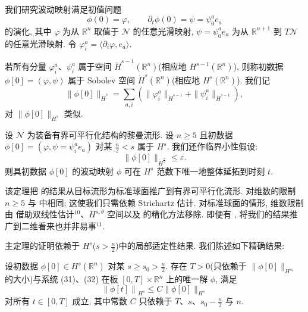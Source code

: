 我们研究波动映射满足初值问题
\[
\phi(0)=\varphi,\qquad\partial_{t}\phi(0)=\psi=\psi_{0}^{a}e_{a}
\]
的演化, 其中 $\varphi$ 为从 $\mathbb{R}^n$ 取值于 $\mathcal{N}$ 的任意光滑映射, $\psi = \psi_0^a e_a$ 为从 $\mathbb{R}^{n+1}$ 到 $T\mathcal{N}$ 的任意光滑映射. 令 $\varphi_i^a = \langle \partial_i \varphi, e_a \rangle$.
\begin{definition}\label{def:2.15}
若所有分量 $\varphi_i^a$、$\psi_i^a$ 属于空间 $\dot{H}^{s-1}(\mathbb{R}^n)$(相应地 $H^{s-1}(\mathbb{R}^n)$), 则称初数据 $\phi[0] = (\varphi, \psi)$ 属于 Sobolev 空间 $\dot{H}^s(\mathbb{R}^n)$(相应地 $H^s(\mathbb{R}^n)$). 我们记
\[
\|\phi[0]\|_{\dot{H}^{s}}=\sum_{a,i}\left(\|\varphi_{i}^{a}\|_{\dot{H}^{s-1}}+\|\psi_{i}^{a}\|_{\dot{H}^{s-1}}\right),
\]
对 $\|\phi[0]\|_{H^{s}}$ 类似.\end{definition}

\begin{theorem}\label{thm:2.16}
设 $\mathcal{N}$ 为装备有界可平行化结构的黎曼流形. 设 $n \geq 5$ 且初数据 $\phi[0] = (\varphi, \psi = \psi_i^a e_a)$ 对某 $\frac{n}{2} < s$ 属于 $H^s$. 我们还作临界小性假设:
\[
\|\phi[0]\|_{\dot{H}^{\frac{n}{2}}}\leq\varepsilon.
\]
则具初数据 $\phi[0]$ 的波动映射 $\phi$ 可在 $H^{s}$ 范数下唯一地整体延拓到时刻 $t$.\end{theorem}

\begin{remark}\label{rem:2.17}
该定理把 \cite{klai70} 的结果从目标流形为标准球面推广到有界可平行化流形. 对维数的限制 $n \geq 5$ 与 \cite{klai70} 中相同; 这使我们只需依赖 Strichartz 估计. 对标准球面的情形, 维数限制由 \cite{klai71} 借助双线性估计$^{10}$、$H^{s,\theta}$ 空间以及 \cite{klai73} 的精化方法移除. 即便有 \cite{klai71}, 将我们的结果推广到二维看来也并非易事$^{11}$.\end{remark}

主定理的证明依赖于 $H^{s}$($s > \frac{n}{2}$)中的局部适定性结果. 我们陈述如下精确结果:
\begin{theorem}\label{thm:2.18}
设初数据 $\phi[0] \in H^s(\mathbb{R}^n)$ 对某 $s \geq s_0 > \frac{n}{2}$. 存在 $T > 0$(只依赖于 $\|\phi[0]\|_{H^{s_0}}$ 的大小)与系统 (31)、(32) 在板 $[0, T] \times \mathbb{R}^n$ 上的唯一解 $\phi$, 满足
\[
\left\|\phi[t]\right\|_{H^{s}}\leq C\|\phi[0]\|_{H^{s}}
\]
对所有 $t \in [0, T]$ 成立, 其中常数 $C$ 只依赖于 $T$、$s$、$s_0 - \frac{n}{2}$ 与 $n$.\end{theorem}


